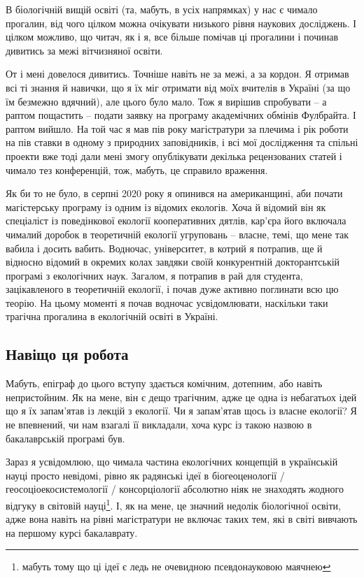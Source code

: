 \documentclass[
  11pt,
]{book}
\begin{document}
В біологічній вищій освіті (та, мабуть, в усіх напрямках) у нас є чимало
прогалин, від чого цілком можна очікувати низького рівня наукових
досліджень. І цілком можливо, що читач, як і я, все більше помічав ці
прогалини і починав дивитись за межі вітчизняної освіти.

От і мені довелося дивитись. Точніше навіть не за межі, а за кордон. Я
отримав всі ті знання й навички, що я їх міг отримати від моїх вчителів
в Україні (за що їм безмежно вдячний), але цього було мало. Тож я
вирішив спробувати -- а раптом пощастить -- подати заявку на програму
академічних обмінів Фулбрайта. І раптом вийшло. На той час я мав пів
року магістратури за плечима і рік роботи на пів ставки в одному з
природних заповідників, і всі мої дослідження та спільні проекти вже
тоді дали мені змогу опублікувати декілька рецензованих статей і чимало
тез конференцій, тож, мабуть, це справило враження.

Як би то не було, в серпні 2020 року я опинився на американщині, аби
почати магістерську програму із одним із відомих екологів. Хоча й
відомий він як спеціаліст із поведінкової екології кооперативних дятлів,
кар'єра його включала чималий доробок в теоретичній екології угруповань
-- власне, темі, що мене так вабила і досить вабить. Водночас,
університет, в котрий я потрапив, ще й відносно відомий в окремих колах
завдяки своїй конкурентній докторантській програмі з екологічних наук.
Загалом, я потрапив в рай для студента, зацікавленого в теоретичній
екології, і почав дуже активно поглинати всю цю теорію. На цьому моменті
я почав водночас усвідомлювати, наскільки таки трагічна прогалина в
екологічній освіті в Україні.

\subsection{Навіщо ця робота}\label{whythiswork}

Мабуть, епіграф до цього вступу здається комічним, дотепним, або навіть
непристойним. Як на мене, він є дещо трагічним, адже це одна із
небагатьох ідей що я їх запам'ятав із лекцій з екології. Чи я запам'ятав
щось із власне екології? Я не впевнений, чи нам взагалі її викладали,
хоча курс із такою назвою в бакалаврській програмі був.

Зараз я усвідомлюю, що чимала частина екологічних концепцій в
українській науці просто невідомі, рівно як радянські ідеї в
біогеоценології / геосоціоекосистемології / консорціології абсолютно
ніяк не знаходять жодного відгуку в світовій науці\footnote{мабуть тому
  що ці ідеї є ледь не очевидною псевдонауковою маячнею}. І, як на мене,
це значний недолік біологічної освіти, адже вона навіть на рівні
магістратури не включає таких тем, які в світі вивчають на першому курсі
бакалаврату.
\end{document}
